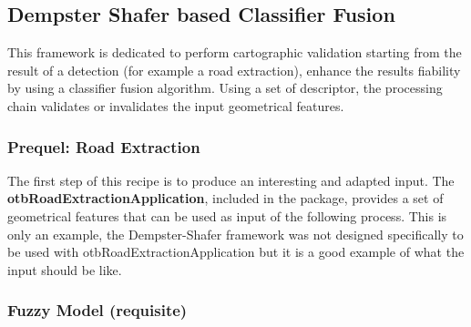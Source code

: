 


\subsection{Dempster Shafer based Classifier Fusion}\label{ssec:classifierfusion}

This framework is dedicated to perform cartographic validation starting from the result of a detection (for example a road extraction), enhance the results fiability by using a classifier fusion algorithm. Using a set of descriptor, the processing chain validates or invalidates the input geometrical features.

\subsubsection{Prequel: Road Extraction}

The first step of this recipe is to produce an interesting and adapted input. The \textbf{otbRoadExtractionApplication},  included in the \app package, provides a set of geometrical features that can be used as input of the following process. This is only an example, the Dempster-Shafer framework was not designed specifically to be used with otbRoadExtractionApplication but it is a good example of what the input should be like.

\subsubsection{Fuzzy Model (requisite)}

